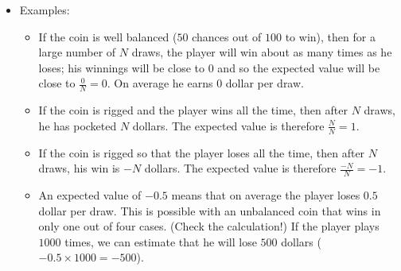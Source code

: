 \documentclass[11pt,class=report,crop=false]{standalone}
\begin{document}
\begin{cours}
\begin{itemize}
  \item Examples:
  \begin{itemize}
    \item If the coin is well balanced ($50$ chances out of $100$ to win),
    then for a large number of $N$ draws, the player will win about as many times as he loses; his winnings will be close to $0$ and so the expected value will be close to $\frac{0}{N} = 0$. On average he earns $0$ dollar per draw.
    
    \item If the coin is rigged and the player wins all the time, then after $N$ draws, he has pocketed $N$ dollars. The expected value is therefore $\frac{N}{N}=1$.
    
    \item If the coin is rigged so that the player loses all the time, then after $N$ draws, his win is $-N$ dollars. The expected value is therefore $\frac{-N}{N}=-1$.
    
    \item An expected value of $-0.5$ means that on average the player loses $0.5$ dollar per draw. This is possible with an unbalanced coin that wins in only one out of four cases. (Check the calculation!) If the player plays $1000$ times, we can estimate that he will lose $500$ dollars ($-0.5 \times 1000 = -500$).
 \end{itemize}     
\end{itemize}

\end{cours}


\end{document}
